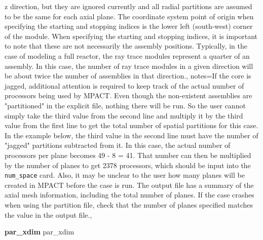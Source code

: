 {{      z direction, but they are ignored currently and all radial partitions are        %
      assumed to be the same for each axial plane.  The coordinate system point of     %
      origin when specifying the starting and stopping indices is the lower left       %
      (south-west) corner of the module. When specifying the starting and stopping     %
      indices, it is important to note that these are not necessarily the assembly     %
      positions.  Typically, in the case of modeling a full reactor, the ray trace     %
      modules represent a quarter of an assembly. In this case,                        %
      the number of ray trace modules in a given direction will be about twice the     %
      number of assemblies in that direction.},
    notes={If the core is jagged, additional attention is required to keep             %
      track of the actual number of processors being used by MPACT.                    %
      Even though the non-existent assemblies are "partitioned" in the                 %
      explicit file, nothing there will be run. So the user cannot simply              %
      take the third value from the second line and multiply it by the third           %
      value from the first line to get the total number of spatial partitions          %
      for this case.  In the example below, the third value in the second              %
      line must have the number of "jagged" partitions subtracted from it.             %
      In this case, the actual number of processors per plane becomes                  %
      49 - 8 = 41. That number can then be multiplied by the number of                 %
      planes to get 2378 processors, which should be input into the                    %
      \texttt{num\_space} card.\newline                                                %
      Also, it may be unclear to the user how many planes will be created              %
      in MPACT before the case is run. The output file has a summary of                %
      the axial mesh information, including the total number of planes.                %
      If the case crashes when using the partition file, check that the                %
      number of planes specified matches the value in the output file.},
   }

   {\bf par\_xdim} par\_xdim

